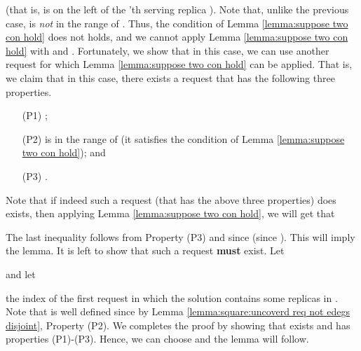 \documentclass[11pt]{article}
\begin{document}
\vspace{0.5cm}

  (that is,  is on the left of the 'th serving replica ).
Note that, unlike the previous case,  is {\em not} in the range of .
Thus, the condition of Lemma \ref{lemma:suppose two con hold} does not holds,
and we cannot apply Lemma \ref{lemma:suppose two con hold} with  and .
Fortunately, we show that in this case, we can use another request for which Lemma \ref{lemma:suppose two con hold} can be applied.
That is, we claim that
in this case, there exists  a request  that has the following three properties.
\begin{enumerate}
\item [(P1)] ;

\item [(P2)]  is in the range of  (it satisfies the condition of Lemma  \ref{lemma:suppose two con hold}); and

\item [(P3)] .

\end{enumerate}
Note that if indeed such a request  (that has the above three properties) does exists,
then
applying Lemma \ref{lemma:suppose two con hold},
we will get that

The last inequality follows from Property (P3) and since  (since ).
This will imply the lemma.
It is left to show that such a request  {\bf must} exist.
Let

and let

the index of the first request in which the solution  contains some replicas in .
Note that  is well defined since  by Lemma \ref{lemma:square:uncoverd req not edegs disjoint}, Property (P2).
We completes the proof by showing
that   exists and has  properties (P1)-(P3).
Hence, we can choose  and the lemma will follow.
\end{document}
